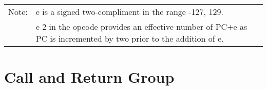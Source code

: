 \documentclass[oneside,a4paper]{book}
\begin{document}
{\begin{tabular}{llcccccccccccccccl}
		\hline

		Note:
			& \multicolumn{17}{l}{\parbox{12cm}{e is a signed two-compliment in the range -127, 129.}}\notet\noteb \\

			& \multicolumn{17}{l}{\parbox{12cm}{e-2 in the opcode provides an effective number of PC+e as PC is incremented by two prior to the addition of e.}}\noteb \\[5pt]
			
		\hline

	\end{tabular}
}

\section{Call and Return Group}
\end{document}

